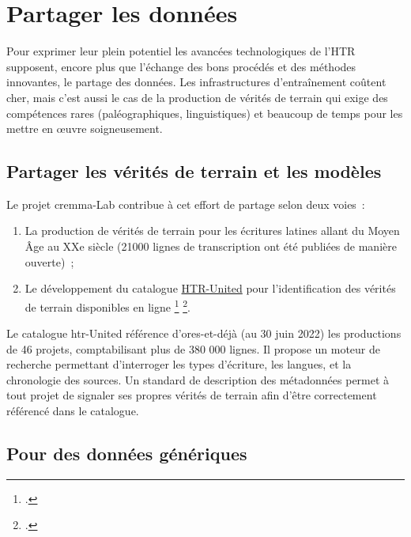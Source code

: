 \documentclass[a4paper,12pt,twoside]{book}
\begin{document}
		\section{Partager les données}
		
			Pour exprimer leur plein potentiel les avancées technologiques de l'HTR
			supposent, encore plus que l'échange des bons procédés et des méthodes
			innovantes, le partage des données. Les infrastructures d'entraînement
			coûtent cher, mais c'est aussi le cas de la production de vérités de
			terrain qui exige des compétences rares (paléographiques, linguistiques)
			et beaucoup de temps pour les mettre en œuvre soigneusement.
			
			\subsection{Partager les vérités de terrain et les modèles}
			
				Le projet \gls{cremma}-Lab contribue à cet effort de partage selon deux voies~:
				
				\begin{enumerate}
					
					\item
					La production de vérités de terrain pour les écritures latines allant
					du Moyen Âge au XXe siècle (21000 lignes de transcription ont été
					publiées de manière ouverte)~;
					\item
					Le développement du catalogue
					\href{https://htr-united.github.io/catalog.html}{HTR-United} pour
					l'identification des vérités de terrain disponibles en ligne
					\footcite{campsCremmaLabProjectsTranscription2022}
					\footcite{chagueSharingHTRDatasets2022}.
				\end{enumerate}
				
				Le catalogue \gls{htr}-United référence d'ores-et-déjà (au 30 juin 2022) les
				productions de 46 projets, comptabilisant plus de 380 000 lignes. Il
				propose un moteur de recherche permettant d'interroger les types
				d'écriture, les langues, et la chronologie des sources. Un standard de
				description des métadonnées permet à tout projet de signaler ses propres
				vérités de terrain afin d'être correctement référencé dans le catalogue.
			
			\subsection{Pour des données génériques}
			
\end{document}
